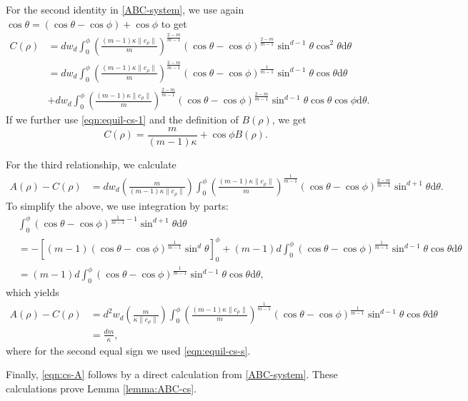 \documentclass[11pt]{amsart}
\def\d{\mathrm{d}}
\newcommand{\dm}{d} %
\begin{document}
For the second identity in \eqref{ABC-system}, we use again $\cos\theta=(\cos\theta-\cos\phi)+\cos\phi$ to get
\begin{align*}
C(\rho)&=\dm w_\dm\int_0^\phi\left(\frac{(m-1)\kappa \|c_\rho\|}{m}\right)^{\frac{2-m}{m-1}}\left(\cos\theta-\cos\phi\right)^{\frac{2-m}{m-1}}\sin^{\dm-1}\theta\cos^2\theta\d\theta\\
&=\dm w_\dm\int_0^\phi\left(\frac{(m-1)\kappa \|c_\rho\|}{m}\right)^{\frac{2-m}{m-1}}\left(\cos\theta-\cos\phi\right)^{\frac{1}{m-1}}\sin^{\dm-1}\theta\cos\theta\d\theta\\
&+\dm w_\dm\int_0^\phi\left(\frac{(m-1)\kappa \|c_\rho\|}{m}\right)^{\frac{2-m}{m-1}}\left(\cos\theta-\cos\phi\right)^{\frac{2-m}{m-1}}\sin^{\dm-1}\theta\cos\theta\cos\phi\d\theta.
\end{align*}
If we further use \eqref{eqn:equil-cs-1} and the definition of $B(\rho)$, we get
\[
C(\rho)=\frac{m}{(m-1)\kappa}+\cos\phi B(\rho).
\]

For the third relationship, we calculate
\begin{align*}
A(\rho)-C(\rho)&=\dm w_\dm\left(\frac{m}{(m-1)\kappa \|c_\rho\|}\right)\int_0^\phi\left(\frac{(m-1)\kappa \|c_\rho\|}{m}\right)^{\frac{1}{m-1}}\left(\cos\theta-\cos\phi\right)^{\frac{2-m}{m-1}}\sin^{\dm+1}\theta\d\theta.
\end{align*}
To simplify the above, we use integration by parts:
\begin{align*}
&\int_0^\phi (\cos\theta-\cos\phi)^{\frac{1}{m-1}-1}\sin^{\dm+1}\theta\d\theta\\
&=-\left[(m-1)(\cos\theta-\cos\phi)^{\frac{1}{m-1}}\sin^\dm\theta\right]^{\phi}_0+(m-1)\dm\int_0^\phi(\cos\theta-\cos\phi)^{\frac{1}{m-1}}\sin^{\dm-1}\theta\cos\theta\d\theta\\
&=(m-1)\dm\int_0^\phi(\cos\theta-\cos\phi)^{\frac{1}{m-1}}\sin^{\dm-1}\theta\cos\theta\d\theta,
\end{align*}
which yields
\begin{align*}
A(\rho)-C(\rho) &=    \dm^2 w_\dm\left(\frac{m}{\kappa \|c_\rho\|}\right)\int_0^\phi \left(\frac{(m-1)\kappa \|c_\rho\|}{m}\right)^{\frac{1}{m-1}} (\cos\theta-\cos\phi)^{\frac{1}{m-1}}\sin^{\dm-1}\theta\cos\theta\d\theta \\
&=\frac{\dm m}{\kappa},
\end{align*}
where for the second equal sign we used \eqref{eqn:equil-cs-s}.

Finally, \eqref{eqn:cs-A} follows by a direct calculation from \eqref{ABC-system}. These calculations prove Lemma \ref{lemma:ABC-cs}.
\end{document}
